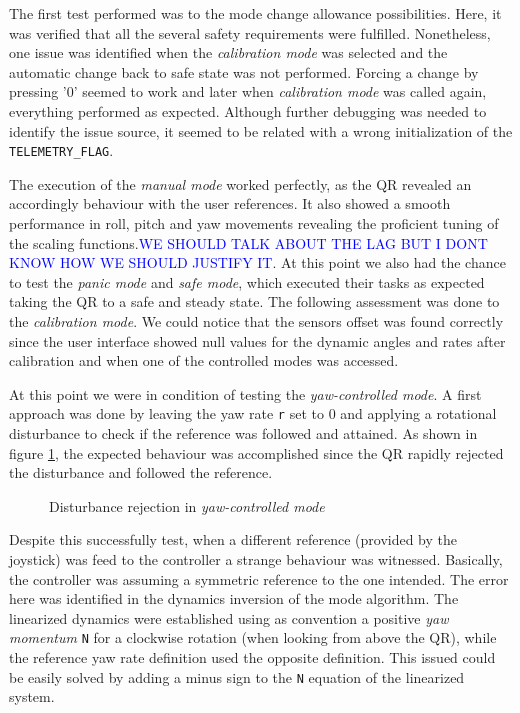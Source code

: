 \documentclass{article}
\newcommand\todo[1]{\textcolor{blue}{#1}} %
\begin{document}
The first test performed was to the mode change allowance possibilities. Here, it was verified that all the several safety requirements were fulfilled. Nonetheless, one issue was identified when the \textit{calibration mode} was selected and the automatic change back to safe state was not performed. Forcing a change by pressing '$0$' seemed to work and later when \textit{calibration mode} was called again, everything performed as expected. Although further debugging was needed to identify the issue source, it seemed to be related with a wrong initialization of the \texttt{TELEMETRY\_FLAG}.

The execution of the \textit{manual mode} worked perfectly, as the QR revealed an accordingly behaviour with the user references. It also showed a smooth performance in roll, pitch and yaw movements revealing the proficient tuning of the scaling functions.\todo{WE SHOULD TALK ABOUT THE LAG BUT I DONT KNOW HOW WE SHOULD JUSTIFY IT}. At this point we also had the chance to test the \textit{panic mode} and \textit{safe mode}, which executed their tasks as expected taking the QR to a safe and steady state. The following assessment was done to the \textit{calibration mode}. We could notice that the sensors offset was found correctly since the user interface showed null values for the dynamic angles and rates after calibration and when one of the controlled modes was accessed.

At this point we were in condition of testing the \textit{yaw-controlled mode}. A first approach was done by leaving the yaw rate \texttt{r} set to 0 and applying a rotational disturbance to check if the reference was followed and attained. As shown in figure \ref{fig:YawControl}, the expected behaviour was accomplished since the QR rapidly rejected the disturbance and followed the reference.

\begin{figure}[ht]
\centering
	\caption{Disturbance rejection in \textit{yaw-controlled mode}}
	\label{fig:YawControl}
\end{figure}

Despite this successfully test, when a different reference (provided by the joystick) was feed to the controller a strange behaviour was witnessed. Basically, the controller was assuming a symmetric reference to the one intended. The error here was identified in the dynamics inversion of the mode algorithm. The linearized dynamics were established using as convention a positive \textit{yaw momentum} \texttt{N} for a clockwise rotation (when looking from above the QR), while the reference yaw rate definition used the opposite definition. This issued could be easily solved by adding a minus sign to the \texttt{N} equation of the linearized system.
\end{document}
